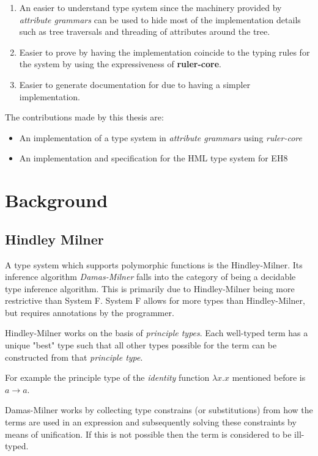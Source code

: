 \documentclass[twoside, titlepage, openright, a4paper]{book}
\newcommand{\ags}{\emph{attribute grammars }}
\newcommand{\rcore}{\emph{ruler-core }}
\begin{document}
\begin{enumerate}
\item An easier to understand type system since the machinery provided by \ags can be used to hide most of the implementation details such as tree traversals and threading of attributes around the tree.
\item Easier to prove by having the implementation coincide to the typing rules for the system by using the expressiveness of \textbf{ruler-core}.
\item Easier to generate documentation for due to having a simpler implementation.
\end{enumerate}

The contributions made by this thesis are:
\begin{itemize}
\item An implementation of a type system in \ags using \rcore
\item An implementation and specification for the HML type system for EH8
\end{itemize}

\chapter{Background}
\section{Hindley Milner}
A type system which supports polymorphic functions is the Hindley-Milner\cite{HM}. Its inference algorithm \emph{Damas-Milner} falls into the category of being a decidable type inference algorithm. This is primarily due to Hindley-Milner being more restrictive than System F. System F allows for more types than Hindley-Milner, but requires annotations by the programmer.

Hindley-Milner works on the basis of \textit{principle types}. Each well-typed term has a unique "best" type such that all other types possible for the term can be constructed from that \textit{principle type}. 

For example the principle type of the \textit{identity} function $\lambda x.x$ mentioned before is $a \rightarrow a$.

Damas-Milner works by collecting type constrains (or substitutions) from how the terms are used in an expression and subsequently solving these constraints by means of unification. If this is not possible then the term is considered to be ill-typed.
\end{document}
